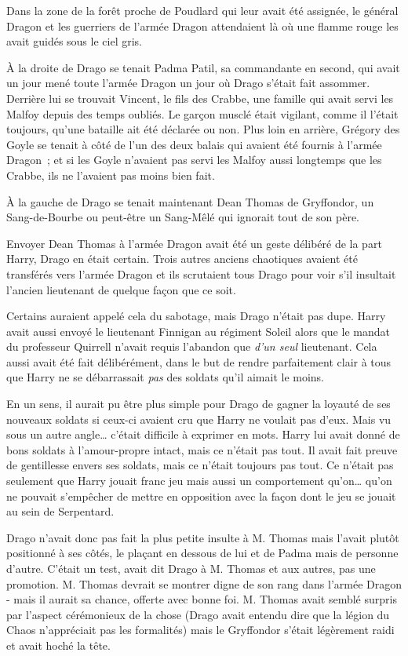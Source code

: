 \later

Dans la zone de la forêt proche de Poudlard qui leur avait été assignée, le général Dragon et les guerriers de l'armée Dragon attendaient là où une flamme rouge les avait guidés sous le ciel gris.

À la droite de Drago se tenait Padma Patil, sa commandante en second, qui avait un jour mené toute l'armée Dragon un jour où Drago s'était fait assommer. Derrière lui se trouvait Vincent, le fils des Crabbe, une famille qui avait servi les Malfoy depuis des temps oubliés. Le garçon musclé était vigilant, comme il l'était toujours, qu'une bataille ait été déclarée ou non. Plus loin en arrière, Grégory des Goyle se tenait à côté de l'un des deux balais qui avaient été fournis à l'armée Dragon~; et si les Goyle n'avaient pas servi les Malfoy aussi longtemps que les Crabbe, ils ne l'avaient pas moins bien fait.

À la gauche de Drago se tenait maintenant Dean Thomas de Gryffondor, un Sang-de-Bourbe ou peut-être un Sang-Mêlé qui ignorait tout de son père.

Envoyer Dean Thomas à l'armée Dragon avait été un geste délibéré de la part Harry, Drago en était certain. Trois autres anciens chaotiques avaient été transférés vers l'armée Dragon et ils scrutaient tous Drago pour voir s'il insultait l'ancien lieutenant de quelque façon que ce soit.

Certains auraient appelé cela du sabotage, mais Drago n'était pas dupe. Harry avait aussi envoyé le lieutenant Finnigan au régiment Soleil alors que le mandat du professeur Quirrell n'avait requis l'abandon que \emph{d'un seul} lieutenant. Cela aussi avait été fait délibérément, dans le but de rendre parfaitement clair à tous que Harry ne se débarrassait \emph{pas} des soldats qu'il aimait le moins.

En un sens, il aurait pu être plus simple pour Drago de gagner la loyauté de ses nouveaux soldats si ceux-ci avaient cru que Harry ne voulait pas d'eux. Mais vu sous un autre angle… c'était difficile à exprimer en mots. Harry lui avait donné de bons soldats à l'amour-propre intact, mais ce n'était pas tout. Il avait fait preuve de gentillesse envers ses soldats, mais ce n'était toujours pas tout. Ce n'était pas seulement que Harry jouait franc jeu mais aussi un comportement qu'on… qu'on ne pouvait s'empêcher de mettre en opposition avec la façon dont le jeu se jouait au sein de Serpentard.

Drago n'avait donc pas fait la plus petite insulte à M. Thomas mais l'avait plutôt positionné à ses côtés, le plaçant en dessous de lui et de Padma mais de personne d'autre. C'était un test, avait dit Drago à M. Thomas et aux autres, pas une promotion. M. Thomas devrait se montrer digne de son rang dans l'armée Dragon - mais il aurait sa chance, offerte avec bonne foi. M. Thomas avait semblé surpris par l'aspect cérémonieux de la chose (Drago avait entendu dire que la légion du Chaos n'appréciait pas les formalités) mais le Gryffondor s'était légèrement raidi et avait hoché la tête.

